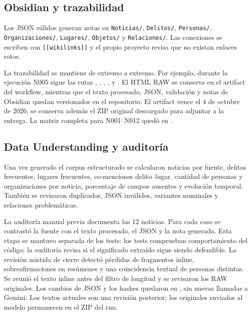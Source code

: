 \documentclass[conference]{IEEEtran}
\begin{document}
\subsection{Obsidian y trazabilidad}
Los JSON válidos generan notas en \texttt{Noticias/}, \texttt{Delitos/}, \texttt{Personas/}, \texttt{Organizaciones/}, \texttt{Lugares/}, \texttt{Objetos/} y \texttt{Relaciones/}. Las conexiones se escriben con \texttt{[[wikilinks]]} y el propio proyecto revisa que no existan enlaces rotos.

La trazabilidad se mantiene de extremo a extremo. Por ejemplo, durante la ejecución N005 sigue las rutas , , , ,  y . El HTML RAW se conserva en el artifact del workflow, mientras que el texto procesado, JSON, validación y notas de Obsidian quedan versionados en el repositorio. El artifact vence el 4 de octubre de 2026; se conserva además el ZIP original descargado para adjuntar a la entrega. La matriz completa para N001--N012 quedó en .

\subsection{Data Understanding y auditoría}
Una vez generado el corpus estructurado se calcularon noticias por fuente, delitos frecuentes, lugares frecuentes, co-menciones delito--lugar, cantidad de personas y organizaciones por noticia, porcentaje de campos ausentes y evolución temporal. También se revisaron duplicados, JSON inválidos, variantes nominales y relaciones problemáticas.

La auditoría manual previa documenta las 12 noticias. Para cada caso se contrastó la fuente con el texto procesado, el JSON y la nota generada. Esta etapa se mantuvo separada de los tests: los tests comprueban comportamiento del código; la auditoría revisa si el significado extraído sigue siendo defendible. La revisión asistida de cierre detectó pérdidas de fragmentos inline, sobreafirmaciones en resúmenes y una coincidencia textual de personas distintas. Se reunió el texto inline antes del filtro de longitud y se revisaron los RAW originales. Los cambios de JSON y los hashes quedaron en , sin nuevas llamadas a Gemini. Los textos actuales son una revisión posterior; los originales enviados al modelo permanecen en el ZIP del run.
\end{document}

